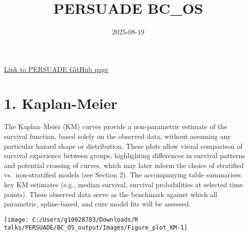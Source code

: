 \documentclass[
]{article}
\title{PERSUADE BC\_OS}
\author{}
\date{\vspace{-2.5em}2025-08-19}
\begin{document}
\maketitle

{
\hypersetup{linkcolor=}
\setcounter{tocdepth}{2}
\tableofcontents
}
\hfill\break

\href{https://github.com/Bram-R/PERSUADE}{Link to PERSUADE GitHub page}

\clearpage

\section{1. Kaplan-Meier}\label{kaplan-meier}

The Kaplan--Meier (KM) curves provide a non-parametric estimate of the
survival function, based solely on the observed data, without assuming
any particular hazard shape or distribution. These plots allow visual
comparison of survival experience between groups, highlighting
differences in survival patterns and potential crossing of curves, which
may later inform the choice of stratified vs.~non-stratified models (see
Section 2). The accompanying table summarises key KM estimates (e.g.,
median survival, survival probabilities at selected time points). These
observed data serve as the benchmark against which all parametric,
spline-based, and cure model fits will be assessed.

\clearpage

\begin{flushleft}\texttt{[image: C:/Users/g10028783/Downloads/R talks/PERSUADE/BC\_OS\_output/Images/Figure\_plot\_KM-1]} \end{flushleft}

\begin{table}[H]
\centering
\caption{\label{tab:Table_1}Observed survival data}
\centering
{}
\end{table}
\end{document}
